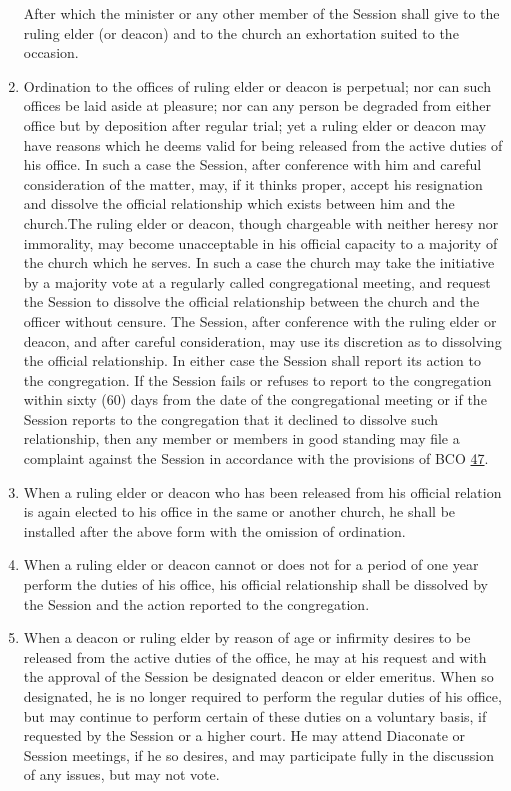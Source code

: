 \documentclass[
]{book}
\begin{document}
\begin{enumerate}
  After which the minister or any other member of the Session shall give to the ruling elder (or deacon) and to the church an exhortation suited to the occasion.
\item
  \protect\hypertarget{26.5}{\href{}{}}Ordination to the offices of ruling elder or deacon is perpetual; nor can such offices be laid aside at pleasure; nor can any person be degraded from either office but by deposition after regular trial; yet a ruling elder or deacon may have reasons which he deems valid for being released from the active duties of his office. In such a case the Session, after conference with him and careful consideration of the matter, may, if it thinks proper, accept his resignation and dissolve the official relationship which exists between him and the church.The ruling elder or deacon, though chargeable with neither heresy nor immorality, may become unacceptable in his official capacity to a majority of the church which he serves. In such a case the church may take the initiative by a majority vote at a regularly called congregational meeting, and request the Session to dissolve the official relationship between the church and the officer without censure. The Session, after conference with the ruling elder or deacon, and after careful consideration, may use its discretion as to dissolving the official relationship. In either case the Session shall report its action to the congregation. If the Session fails or refuses to report to the congregation within sixty (60) days from the date of the congregational meeting or if the Session reports to the congregation that it declined to dissolve such relationship, then any member or members in good standing may file a complaint against the Session in accordance with the provisions of BCO \protect\hyperlink{47}{47}.
\item
  When a ruling elder or deacon who has been released from his official relation is again elected to his office in the same or another church, he shall be installed after the above form with the omission of ordination.
\item
  When a ruling elder or deacon cannot or does not for a period of one year perform the duties of his office, his official relationship shall be dissolved by the Session and the action reported to the congregation.
\item
  When a deacon or ruling elder by reason of age or infirmity desires to be released from the active duties of the office, he may at his request and with the approval of the Session be designated deacon or elder emeritus. When so designated, he is no longer required to perform the regular duties of his office, but may continue to perform certain of these duties on a voluntary basis, if requested by the Session or a higher court. He may attend Diaconate or Session meetings, if he so desires, and may participate fully in the discussion of any issues, but may not vote.
\end{enumerate}
\end{document}
